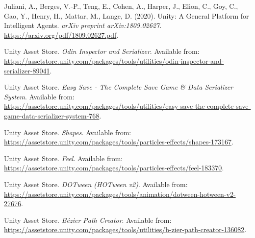 \begin{thebibliography}{1}
	Juliani, A., Berges, V.-P., Teng, E., Cohen, A., Harper, J., Elion, C., Goy, C., Gao, Y., Henry, H., Mattar, M., Lange, D. (2020). Unity: A General Platform for Intelligent Agents. \textit{arXiv preprint arXiv:1809.02627}. \url{https://arxiv.org/pdf/1809.02627.pdf}.
	
	
	Unity Asset Store. \textit{Odin Inspector and Serializer}. Available from: \url{https://assetstore.unity.com/packages/tools/utilities/odin-inspector-and-serializer-89041}.
	
	Unity Asset Store. \textit{Easy Save - The Complete Save Game \& Data Serializer System}. Available from: \url{https://assetstore.unity.com/packages/tools/utilities/easy-save-the-complete-save-game-data-serializer-system-768}.
	
	Unity Asset Store. \textit{Shapes}. Available from: \url{https://assetstore.unity.com/packages/tools/particles-effects/shapes-173167}.
	
	Unity Asset Store. \textit{Feel}. Available from: \url{https://assetstore.unity.com/packages/tools/particles-effects/feel-183370}.
	
	Unity Asset Store. \textit{DOTween (HOTween v2)}. Available from: \url{https://assetstore.unity.com/packages/tools/animation/dotween-hotween-v2-27676}.
	
	Unity Asset Store. \textit{Bézier Path Creator}. Available from: \url{https://assetstore.unity.com/packages/tools/utilities/b-zier-path-creator-136082}.
	
	
\end{thebibliography}